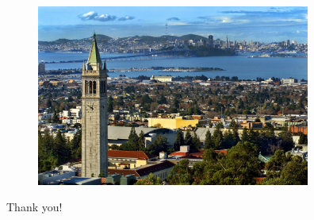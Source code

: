 \documentclass[10pt]{beamer}
\begin{document}
\begin{frame}
\begin{figure}
\includegraphics[width=9cm]{../Figures/berkeley.jpg}
\end{figure}
\centering
Thank you!

\footnotesize
\color{white}\cite{mori,waata,seker,espel,sanchez,cardoni,ivanov,travleev,espel_2013,ivanov_2013,daeubler,ivanov_2014,daeubler_2015,henry,aviles,li_2013,suikkanen,wu,hu,vazquez,meplan,aufiero,aufiero_2017,krolikowski,aufiero_2016,pham,novak,guo,scarlat,yexin,gurecky,sjenitzer,breitkreutz,gill,erfaninia,bennett,gourbesville,guo_2013,hoogenboom,kelly,laureau,smure,pecchia,shan,li_2012,kotlyar_2011}
\color{black}
\end{frame}

\appendix

\begin{frame}[allowframebreaks]
\footnotesize


\end{frame}
\end{document}

